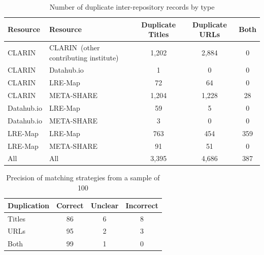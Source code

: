 \documentclass[smallextended]{svjour3}       %
\begin{document}
\begin{table}
    \begin{center}
        \begin{tabular}{ll|ccc}
        Resource    & Resource    & Duplicate Titles & Duplicate URLs & Both \\
        \hline                                                                  
        CLARIN      & CLARIN{\tiny~(other contributing institute)}      & 1,202            & 2,884          & 0    \\
        CLARIN      & Datahub.io  & 1                & 0              & 0    \\
        CLARIN      & LRE-Map     & 72               & 64             & 0    \\
        CLARIN      & META-SHARE  & 1,204            & 1,228          & 28    \\
        Datahub.io  & LRE-Map     & 59               & 5              & 0    \\
        Datahub.io  & META-SHARE  & 3                & 0              & 0    \\
        LRE-Map     & LRE-Map     & 763              & 454            & 359  \\
        LRE-Map     & META-SHARE  & 91               & 51             & 0    \\
        \hline
        All         & All         & 3,395            & 4,686          & 387  \\
        \end{tabular}
    \end{center}
    \caption{\label{tab:dupes}Number of duplicate inter-repository records by type}
\end{table}

\begin{table}
    \begin{tabular}{l|ccc}
        Duplication & Correct & Unclear & Incorrect \\
        \hline                    
        Titles      &    86   &   6     &    8      \\ 
        URLs        &    95   &   2     &    3      \\
        Both        &    99   &   1     &    0      \\
    \end{tabular}
    \caption{\label{tab:dupe-precision}Precision of matching strategies from a
    sample of 100}
\end{table}
\end{document}
